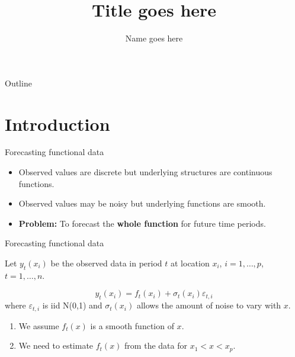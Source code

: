 \documentclass[14pt,xcolor=dvipsnames]{beamer}
\title{Title goes here}
\author{Name goes here}
\begin{document}
 
\begin{frame}
\titlepage
\end{frame}
 
\begin{frame}{Outline}
\tableofcontents
\end{frame}
 
\section{Introduction}
 
\begin{frame}{Forecasting functional data}
\begin{itemize}[<+-| alert@+>]
\item Observed values are discrete but underlying structures are 
continuous functions.
\item Observed values may be noisy but underlying functions are 
smooth.
\item \textbf{Problem:} To forecast the \textbf{whole function} for 
future time periods.
\end{itemize}
\end{frame}
 
\begin{frame}{Forecasting functional data}
 
Let $y_t(x_i)$ be the observed data in period $t$ at location $x_i$, 
$i=1,\dots,p$, $t=1,\dots,n$.
\pause
 
\begin{block}{}
\[
y_t(x_i) = f_t(x_i) + \sigma_t(x_i)\varepsilon_{t,i}
\]
where $\varepsilon_{t,i}$ is iid N(0,1) and $\sigma_t(x_i)$ allows the 
amount of noise to vary with $x$.
\end{block}
\pause
 
\begin{enumerate}[<+-| alert@+>]
\item We assume $f_t(x)$ is a smooth function of $x$.
\item We need to estimate $f_t(x)$ from the data for $x_1 < x < x_p$.
\end{enumerate}
\end{frame}
 
\end{document}
